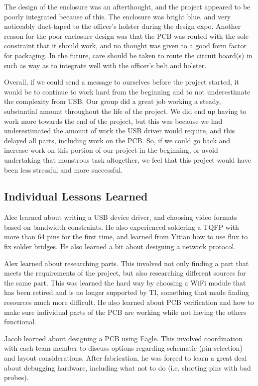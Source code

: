 \documentclass[12pt]{article}
\begin{document}
The design of the enclosure was an afterthought, and the project appeared to be
poorly integrated because of this. The enclosure was bright blue, and very
noticeably duct-taped to the officer's holster during the design expo. Another
reason for the poor enclosure design was that the PCB was routed with the sole
constraint that it should work, and no thought was given to a good form factor
for packaging. In the future, care should be taken to route the circuit
board(s) in such as way as to integrate well with the officer's belt and
holster.

Overall, if we could send a message to ourselves before the project started, it
would be to continue to work hard from the beginning and to not underestimate
the complexity from USB. Our group did a great job working a steady,
substantial amount throughout the life of the project. We did end up having to
work more towards the end of the project, but this was because we had
underestimated the amount of work the USB driver would require, and this
delayed all parts, including work on the PCB. So, if we could go back and
increase work on this portion of our project in the beginning, or avoid
undertaking that monstrous task altogether, we feel that this project would
have been less stressful and more successful.

\subsection{Individual Lessons Learned}
Alec learned about writing a USB device driver, and choosing video formats
based on bandwidth constraints. He also experienced soldering a TQFP with more
than 64 pins for the first time, and learned from Yitian how to use flux to fix
solder bridges. He also learned a bit about designing a network protocol.

Alex learned about researching parts. This involved not only finding a part
that meets the requirements of the project, but also researching different
sources for the same part. This was learned the hard way by choosing a WiFi
module that has been retired and is no longer supported by TI, something that
made finding resources much more difficult. He also learned about PCB
verification and how to make sure individual parts of the PCB are working while
not having the others functional. 

Jacob learned about designing a PCB using Eagle. This involved coordination
with each team member to discuss options regarding schematic (pin selection)
and layout considerations. After fabrication, he was forced to learn a great
deal about debugging hardware, including what not to do (i.e. shorting pins
with bad probes).
\end{document}
